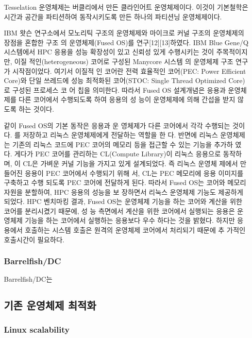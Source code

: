 Tesselation 운영체제는 버클리에서 만든 클라인어트 운영체제이다.
이것이 기본철학은 시간과 공간을 파티션하여 동작시키도록 만든 하나의 파티션닝 운영체제이다.

IBM 왓슨 연구소에서 모노리틱 구조의 운영체제와
마이크로 커널 구조의 운영체제의 장점을 혼합한 구조
의 운영체제(Fused OS)를 연구[12][13]하였다. IBM
Blue Gene/Q 시스템에서 HPC 응용을 성능 확장성이
있고 신뢰성 있게 수행시키는 것이 주목적이지만, 이질
적인(heterogeneous) 코어로 구성된 Manycore 시스템
의 운영체제 구조 연구가 시작점이었다. 여기서 이질적
인 코어란 전력 효율적인 코어(PEC: Power Efficient
Core)와 단일 쓰레드에 성능 최적화된 코어(STOC:
Single Thread Optimized Core)로 구성된 프로세스 코
어 칩을 의미한다. 따라서 Fused OS 설계개념은 응용과
운영체제를 다른 코어에서 수행되도록 하여 응용의 성
능이 운영체제에 의해 간섭을 받지 않도록 하는 것이다.


같이 Fused OS의 기본 동작은 응용과 운
영체제가 다른 코어에서 각각 수행되는 것이다.
를 저장하고 리눅스 운영체제에게 전달하는 역할을 한
다. 반면에 리눅스 운영체제는 기존의 리눅스 코드에
PEC 코어의 메모리 등을 접근할 수 있는 기능을 추가하
였다. 게다가 PEC 코어를 관리하는 CL(Compute
Library)이 리눅스 응용으로 동작하며, 이 CL은 가벼운
커널 기능을 가지고 있게 설계되었다. 즉 리눅스 운영체
제에서 만들어진 응용이 PEC 코어에서 수행되기 위해
서, CL는 PEC 메모리에 응용 이미지를 구축하고 수행
되도록 PEC 코어에 전달하게 된다. 따라서 Fused OS는
코어와 메모리 자원을 분할하여, HPC 응용의 성능을 보
장하면서 리눅스 운영체제 기능도 제공하게 되었다.
HPC 벤치마킹 결과, Fused OS는 운영체제 기능을
하는 코어와 계산을 위한 코어를 분리시켰기 때문에, 성
능 측면에서 계산을 위한 코어에서 실행되는 응용은 운
영체제 기능을 하는 코어에서 실행하는 응용보다 우수
하다는 것을 밝혔다. 하지만 응용에서 호출하는 시스템
호출은 원격의 운영체제 코어에서 처리되기 때문에 추
가적인 호출시간이 필요하다.



\subsubsection{Barrelfish/DC}

Barrelfish/DC는


\subsection{기존 운영체제 최적화}

\subsubsection{Linux scalability}

